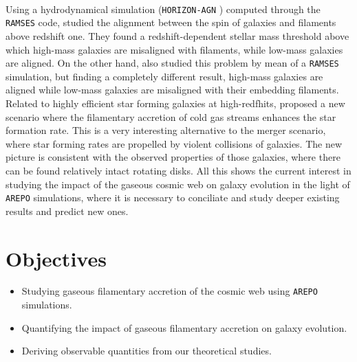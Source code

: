 \documentclass[a4,useAMS,usenatbib,usegraphicx,12pt]{article}
\begin{document}
\

Using a hydrodynamical simulation (\footnotesize{\texttt{HORIZON-AGN}}
\normalsize) computed through the \texttt{RAMSES} code, \citet{Dubois14} 
studied the alignment between the spin of galaxies and filaments above redshift
one. They found a redshift-dependent stellar mass threshold above which 
high-mass galaxies are misaligned with filaments, while low-mass galaxies are 
aligned. On the other hand, \citet{Hahn10} also studied this problem by mean of 
a \texttt{RAMSES} simulation, but finding a completely different result, 
high-mass galaxies are aligned while low-mass galaxies are misaligned with 
their embedding filaments. Related to highly efficient star forming galaxies at 
high-redfhits, \citet{Dekel09} proposed a new scenario where the filamentary 
accretion of cold gas streams enhances the star formation rate. This is a very 
interesting alternative to the merger scenario, where star forming rates are 
propelled by violent collisions of galaxies. The new picture is consistent
with the observed properties of those galaxies, where there can be found 
relatively intact rotating disks. All this shows the current interest in 
studying the impact of the gaseous cosmic web on galaxy evolution in the light 
of \texttt{AREPO} simulations, where it is necessary to conciliate and study 
deeper existing results and predict new ones.





\newpage
\section{Objectives}


\begin{itemize}

\item[\checkmark] Studying gaseous filamentary accretion of the cosmic web using 
\texttt{AREPO} simulations.

\item[\checkmark] Quantifying the impact of gaseous filamentary accretion on 
galaxy evolution.

\item[\checkmark] Deriving observable quantities from our theoretical studies.


\end{itemize}
\end{document}
